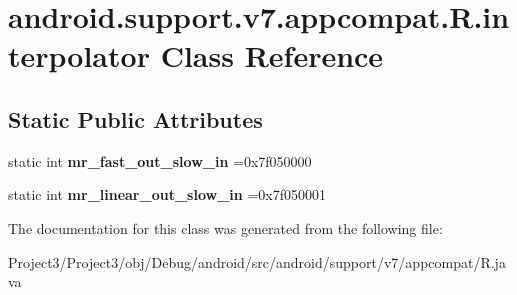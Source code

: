 \hypertarget{classandroid_1_1support_1_1v7_1_1appcompat_1_1R_1_1interpolator}{}\section{android.\+support.\+v7.\+appcompat.\+R.\+interpolator Class Reference}
\label{classandroid_1_1support_1_1v7_1_1appcompat_1_1R_1_1interpolator}
\subsection*{Static Public Attributes}
\begin{DoxyCompactItemize}
\item 
\mbox{\label{classandroid_1_1support_1_1v7_1_1appcompat_1_1R_1_1interpolator_a3fc9d14524a100db5740924bad9f29d0}} 
static int {\bfseries mr\+\_\+fast\+\_\+out\+\_\+slow\+\_\+in} =0x7f050000
\item 
\mbox{\label{classandroid_1_1support_1_1v7_1_1appcompat_1_1R_1_1interpolator_a6e5e1e41ddd220bba92e8fad9823103e}} 
static int {\bfseries mr\+\_\+linear\+\_\+out\+\_\+slow\+\_\+in} =0x7f050001
\end{DoxyCompactItemize}


The documentation for this class was generated from the following file\+:\begin{DoxyCompactItemize}
\item 
Project3/\+Project3/obj/\+Debug/android/src/android/support/v7/appcompat/R.\+java\end{DoxyCompactItemize}
